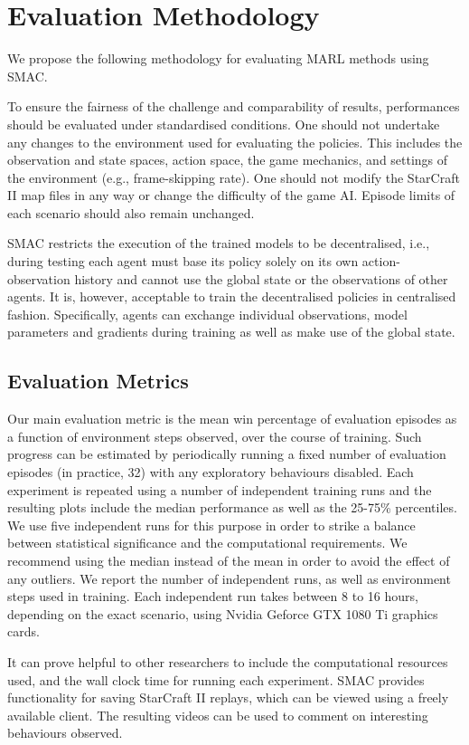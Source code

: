 \section{Evaluation Methodology}\label{appendix:methodology}

We propose the following methodology for evaluating MARL methods using SMAC. 

To ensure the fairness of the challenge and comparability of results, performances should be evaluated under standardised conditions. 
One should not undertake any changes to the environment used for evaluating the policies. 
This includes the observation and state spaces, action space, the game mechanics, and settings of the environment (e.g., frame-skipping rate).
One should not modify the StarCraft II map files in any way or change the difficulty of the game AI. Episode limits of each scenario should also remain unchanged. %

SMAC restricts the execution of the trained models to be decentralised, i.e., during testing each agent must base its policy solely on its own action-observation history and cannot use the global state or the observations of other agents. %
It is, however, acceptable to train the decentralised policies in centralised fashion. Specifically, agents can exchange individual observations, model parameters and gradients during training as well as make use of the global state. %

\subsection{Evaluation Metrics}


Our main evaluation metric is the mean win percentage of evaluation episodes as a function of environment steps observed, over the course of training. 
Such progress can be estimated by periodically running a fixed number of evaluation episodes (in practice, 32) with any exploratory behaviours disabled. 
Each experiment is repeated using a number of independent training runs and the resulting plots include the median performance as well as the 25-75\% percentiles. 
We use five independent runs for this purpose in order to strike a balance between statistical significance and the computational requirements.
We recommend using the median instead of the mean in order to avoid the effect of any outliers. 
We report the number of independent runs, as well as environment steps used in training. %
Each independent run takes between 8 to 16 hours, depending on the exact scenario, using Nvidia Geforce GTX 1080 Ti graphics cards.



It can prove helpful to other researchers to include the computational resources used, and the wall clock time for running each experiment. SMAC provides functionality for saving StarCraft II replays, which can be viewed using a freely available client. The resulting videos can be used to comment on interesting behaviours observed.
